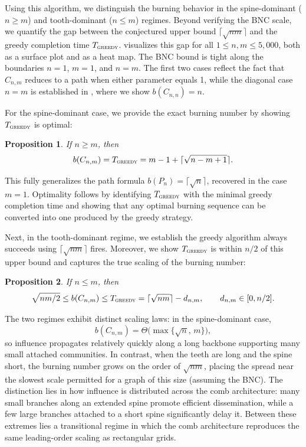 \documentclass{article}
\newcommand{\gr}{\textsc{greedy}}
\newtheorem{proposition}{Proposition}
\begin{document}
Using this algorithm, we distinguish the burning behavior in the spine-dominant ($n \ge m$) and tooth-dominant ($n \le m$) regimes. Beyond verifying the BNC scale, we quantify the gap between the conjectured upper bound $\lceil \sqrt{nm} \rceil$ and the greedy completion time $T_\gr$.  visualizes this gap for all $1 \le n,m \le 5{,}000$, both as a surface plot and as a heat map. The BNC bound is tight along the boundaries $n=1$, $m=1$, and $n=m$. The first two cases reflect the fact that $C_{n,m}$ reduces to a path when either parameter equals 1, while the diagonal case $n=m$ is established in , where we show $b(C_{n,n})=n$. 


For the spine-dominant case, we provide the exact burning number by showing $T_\gr$ is optimal:

\begin{proposition}\label{prop: spine-dominant}
    If $n \ge m$, then
    \[
    b(C_{n,m}) = T_\gr = m-1 + \lceil \sqrt{n - m + 1}\rceil.
    \]
\end{proposition}

This fully generalizes the path formula $b(P_n)=\lceil \sqrt n\rceil$, recovered in the case $m=1$. Optimality follows by identifying $T_\gr$ with the minimal greedy completion time and showing that any optimal burning sequence can be converted into one produced by the greedy strategy.

Next, in the tooth-dominant regime, we establish the greedy algorithm always succeeds using $\lceil \sqrt{nm}\rceil$ fires. Moreover, we show $T_\gr$ is within $n/2$ of this upper bound and captures the true scaling of the burning number:

\begin{proposition}\label{prop: tooth-dominant}
    If $n \le m$, then 
    \[
    \sqrt{nm/2} \le b(C_{n,m}) \le T_\gr = \lceil \sqrt{nm}\rceil - d_{n,m}, \qquad d_{n,m} \in [0,n/2].
    \]
\end{proposition}

The two regimes exhibit distinct scaling laws: in the spine-dominant case,
\[
b(C_{n,m}) = \Theta\!\big(\max\{\sqrt n,\, m\}\big),
\]
so influence propagates relatively quickly along a long backbone supporting many small attached communities. In contrast, when the teeth are long and the spine short, the burning number grows on the order of $\sqrt{nm}$, placing the spread near the slowest scale permitted for a graph of this size (assuming the BNC). The distinction lies in how influence is distributed across the comb architecture: many small branches along an extended spine promote efficient dissemination, while a few large branches attached to a short spine significantly delay it. Between these extremes lies a transitional regime in which the comb architecture reproduces the same leading-order scaling as rectangular grids.
\end{document}
